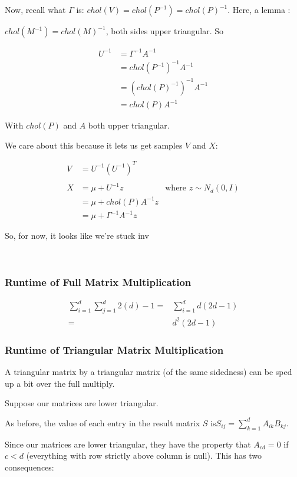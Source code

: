 \documentclass[english]{article}
\begin{document}
Now, recall what $\Gamma$ is: $chol(V)=chol(P^{-1})=chol(P)^{-1}$.
Here, a lemma :

$chol(M^{-1})=chol(M)^{-1}$, both sides upper triangular. So 

\begin{align*}
U^{-1} & =\Gamma^{-1}A^{-1}\\
 & =chol(P^{-1})^{-1}A^{-1}\\
 & =\left(chol(P)^{-1}\right)^{-1}A^{-1}\\
 & =chol(P)A^{-1}
\end{align*}


With $chol(P)$ and $A$ both upper triangular.

We care about this because it lets us get samples $V$ and $X$:

\begin{align*}
V & =U^{-1}\left(U^{-1}\right)^{T}\\
\\
X & =\mu+U^{-1}z & \text{where }z\sim N_{d}(0,I)\\
 & =\mu+chol(P)A^{-1}z\\
 & =\mu+\Gamma^{-1}A^{-1}z
\end{align*}


So, for now, it looks like we're stuck inv

~


\subsubsection*{Runtime of Full Matrix Multiplication}

\begin{align*}
\sum_{i=1}^{d}\sum_{j=1}^{d}2(d)-1= & \sum_{i=1}^{d}d(2d-1)\\
= & d^{2}(2d-1)
\end{align*}



\subsubsection*{Runtime of Triangular Matrix Multiplication}

A triangular matrix by a triangular matrix (of the same sidedness)
can be sped up a bit over the full multiply.

Suppose our matrices are lower triangular.

As before, the value of each entry in the result matrix $S$ is$S_{ij}=\sum_{k=1}^{d}A_{ik}B_{kj}$.

Since our matrices are lower triangular, they have the property that
$A_{cd}=0$ if $c<d$ (everything with row strictly above column is
null). This has two consequences:
\end{document}
